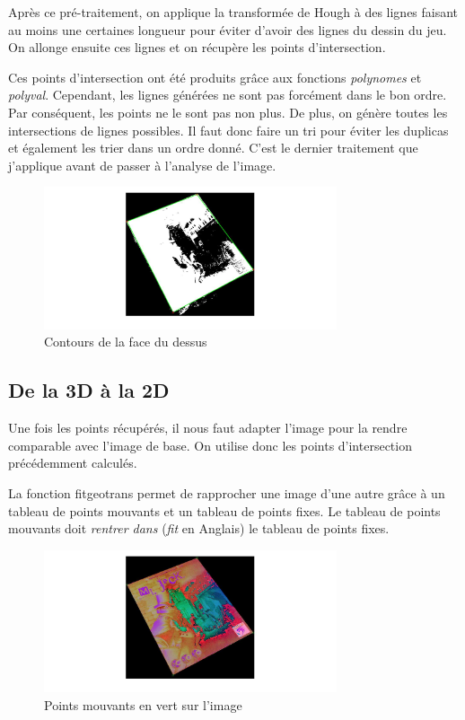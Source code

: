 \documentclass{st50_template}
\begin{document}
Après ce pré-traitement, on applique la transformée de Hough à des lignes faisant au moins une certaines longueur pour éviter d'avoir des lignes du dessin du jeu. On allonge ensuite ces lignes et on récupère les points d'intersection. 

Ces points d'intersection ont été produits grâce aux fonctions \emph{polynomes} et \emph{polyval}. Cependant, les lignes générées ne sont pas forcément dans le bon ordre. Par conséquent, les points ne le sont pas non plus. De plus, on génère toutes les intersections de lignes possibles. Il faut donc faire un tri pour éviter les duplicas et également les trier dans un ordre donné. C'est le dernier traitement que j'applique avant de passer à l'analyse de l'image.

\begin{figure}[ht]
    \centering
    \includegraphics[width=0.77\textwidth]{images/contourEtPts.jpg}
    \caption{Contours de la face du dessus}
    \label{contourEtPts}
\end{figure}

\subsection{De la 3D à la 2D}
Une fois les points récupérés, il nous faut adapter l'image pour la rendre comparable avec l'image de base. On utilise donc les points d'intersection précédemment calculés.

La fonction fitgeotrans permet de rapprocher une image d'une autre grâce à un tableau de points mouvants et un tableau de points fixes. Le tableau de points mouvants doit \emph{rentrer dans} (\emph{fit} en Anglais) le tableau de points fixes.

\begin{figure}[ht]
    \centering
    \includegraphics[width=0.77\textwidth]{images/movingPoints.jpg}
    \caption{Points mouvants en vert sur l'image}
    \label{movingPoints}
\end{figure}
\end{document}
